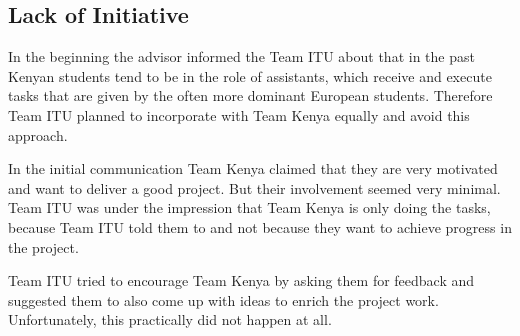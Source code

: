 
\subsection{Lack of Initiative}
\label{sec:initiative_lack}

In the beginning the advisor informed the Team ITU about that in the past Kenyan students tend to be in the role of assistants, which receive and execute tasks that are given by the often more dominant European students. Therefore Team ITU planned to incorporate with Team Kenya equally and avoid this approach.

In the initial communication Team Kenya claimed that they are very motivated and want to deliver a good project. But their involvement seemed very minimal. Team ITU was under the impression that Team Kenya is only doing the tasks, because Team ITU told them to and not because they want to achieve progress in the project.

Team ITU tried to encourage Team Kenya by asking them for feedback and suggested them to also come up with ideas to enrich the project work. Unfortunately, this practically did not happen at all.




